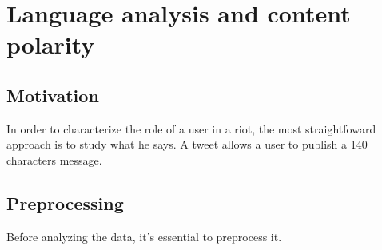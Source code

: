 \documentclass[a4paper,12pt]{report}
\newcommand{\toprt}[1]{
\pgfplotstableread[col sep=comma, ignore chars={\",\\,\#}]{#1}{\table}

\pgfplotstabletypeset[
	columns/content/.style={column type=C},
	string type,
	every head row/.style={
        before row={\toprule}, %
        after row={
            \midrule} %
            },
    after row={\midrule}, %
    every last row/.style={after row=\bottomrule}, %
    ] {\table}
}
\begin{document}
\newpage



\chapter{Language analysis and content polarity}
\section{Motivation}
In order to characterize the role of a user in a riot, the most straightfoward approach is to study what he says. A tweet allows a user to publish a 140 characters message. 

\section{Preprocessing}
Before analyzing the data, it's essential to preprocess it. 

\end{document}
